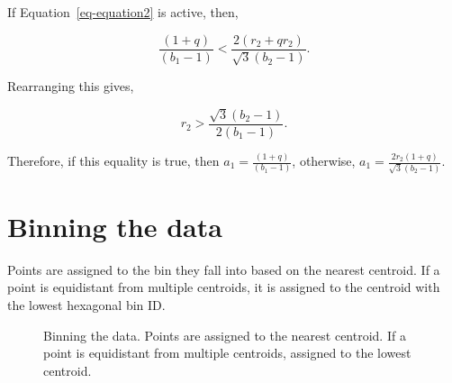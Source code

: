 \documentclass[
  12pt]{article}
\begin{document}
If Equation~\ref{eq-equation2} is active, then,

\[
\frac{(1 + q)}{(b_1 - 1)} < \frac{2(r_2 + qr_2)}{\sqrt{3}(b_2 - 1)}.
\]

Rearranging this gives,

\[
r_2 > \frac{\sqrt{3}(b_2 - 1)}{2(b_1 - 1)}.
\]

Therefore, if this equality is true, then
\(a_1 = \frac{(1+q)}{(b_1 - 1)}\), otherwise,
\(a_1 = \frac{2r_2(1+q)}{\sqrt{3}(b_2 - 1)}\).

\newpage

\section{Binning the data}\label{binning-the-data}

Points are assigned to the bin they fall into based on the nearest
centroid. If a point is equidistant from multiple centroids, it is
assigned to the centroid with the lowest hexagonal bin ID.

\begin{figure}


\caption{\label{fig-assign-data}Binning the data. Points are assigned to
the nearest centroid. If a point is equidistant from multiple centroids,
assigned to the lowest centroid.}

\end{figure}%

\newpage
\end{document}
